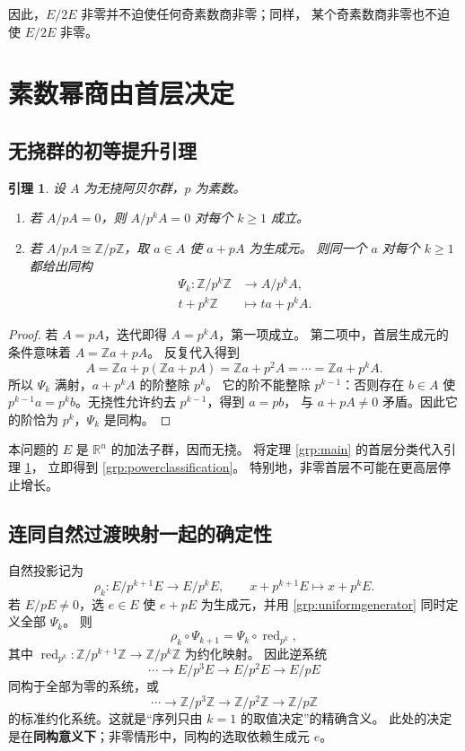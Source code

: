 \documentclass[11pt,a4paper,oneside,openany]{book}
\theoremstyle{lecture}
\newtheorem{lemma}[theorem]{引理}
\newcommand{\R}{\mathbb R}
\newcommand{\Z}{\mathbb Z}
\numberwithin{equation}{section}
\begin{document}
因此，$E/2E$ 非零并不迫使任何奇素数商非零；同样，
某个奇素数商非零也不迫使 $E/2E$ 非零。

\section{素数幂商由首层决定}\label{grp:powerssection}

\subsection{无挠群的初等提升引理}

\begin{lemma}\label{grp:torsionfreepowers}
设 $A$ 为无挠阿贝尔群，$p$ 为素数。
\begin{enumerate}
\item 若 $A/pA=0$，则 $A/p^kA=0$ 对每个 $k\ge1$ 成立。
\item 若 $A/pA\cong\Z/p\Z$，取 $a\in A$ 使 $a+pA$ 为生成元。
则同一个 $a$ 对每个 $k\ge1$ 都给出同构
\begin{equation}\label{grp:uniformgenerator}
 \begin{aligned}
 \Psi_k:\Z/p^k\Z&\longrightarrow A/p^kA,\\
 t+p^k\Z&\longmapsto ta+p^kA.
 \end{aligned}
\end{equation}
\end{enumerate}
\end{lemma}

\begin{proof}
若 $A=pA$，迭代即得 $A=p^kA$，第一项成立。
第二项中，首层生成元的条件意味着 $A=\Z a+pA$。
反复代入得到
\[
 A=\Z a+p(\Z a+pA)=\Z a+p^2A
   =\cdots=\Z a+p^kA.
\]
所以 $\Psi_k$ 满射，$a+p^kA$ 的阶整除 $p^k$。
它的阶不能整除 $p^{k-1}$：否则存在 $b\in A$ 使
$p^{k-1}a=p^kb$。无挠性允许约去 $p^{k-1}$，得到 $a=pb$，
与 $a+pA\ne0$ 矛盾。因此它的阶恰为 $p^k$，$\Psi_k$ 是同构。
\end{proof}

本问题的 $E$ 是 $\R^n$ 的加法子群，因而无挠。
将定理 \ref{grp:main} 的首层分类代入引理 \ref{grp:torsionfreepowers}，
立即得到 \eqref{grp:powerclassification}。
特别地，非零首层不可能在更高层停止增长。

\subsection{连同自然过渡映射一起的确定性}

自然投影记为
\[
 \rho_k:E/p^{k+1}E\longrightarrow E/p^kE,\qquad
 x+p^{k+1}E\longmapsto x+p^kE.
\]
若 $E/pE\ne0$，选 $e\in E$ 使 $e+pE$ 为生成元，并用
\eqref{grp:uniformgenerator} 同时定义全部 $\Psi_k$。
则
\[
 \rho_k\circ\Psi_{k+1}
 =\Psi_k\circ\operatorname{red}_{p^k},
\]
其中 $\operatorname{red}_{p^k}:\Z/p^{k+1}\Z\to\Z/p^k\Z$ 为约化映射。
因此逆系统
\[
 \cdots\longrightarrow E/p^3E\longrightarrow E/p^2E
 \longrightarrow E/pE
\]
同构于全部为零的系统，或
\[
 \cdots\longrightarrow\Z/p^3\Z\longrightarrow\Z/p^2\Z
 \longrightarrow\Z/p\Z
\]
的标准约化系统。这就是“序列只由 $k=1$ 的取值决定”的精确含义。
此处的决定是在\textbf{同构意义下}；非零情形中，同构的选取依赖生成元 $e$。
\end{document}
